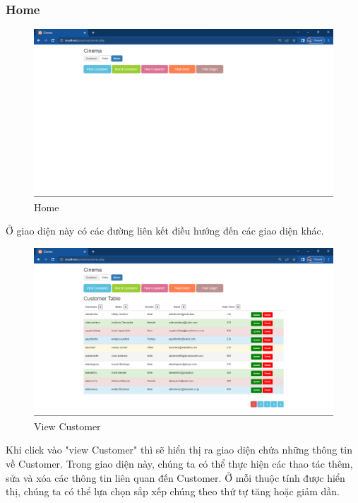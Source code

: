 \subsubsection{Home}
\begin{figure}[H]
    \centering
    \includegraphics[scale=0.45]{images/viewCustomer.png}
    \caption{Home}
\end{figure}
Ở giao diện này có các đường liên kết điều hướng đến các giao diện khác.

\begin{figure}[H]
    \centering
    \includegraphics[scale=0.45]{images/viewAll.png}
    \caption{View Customer}
\end{figure}
Khi click vào "view Customer" thì sẽ hiển thị ra giao diện chứa những thông tin về Customer. Trong giao diện này, chúng ta có thể thực hiện các thao tác thêm, sửa và xóa các thông tin liên quan đến Customer. Ở mỗi thuộc tính được hiển thị, chúng ta có thể lựa chọn sắp xếp chúng theo thứ tự tăng hoặc giảm dần.


